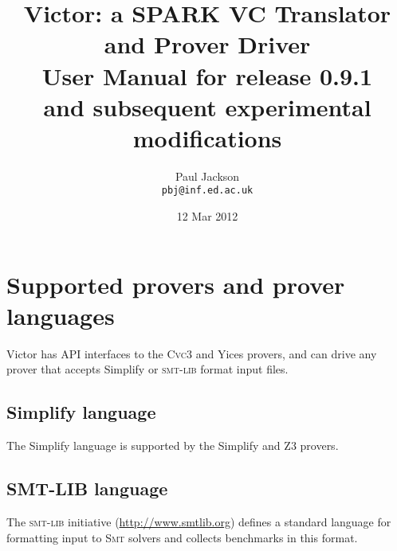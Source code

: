 \documentclass[12pt,fleqn]{article}
\title{Victor: a SPARK VC Translator and Prover Driver \\[4ex]
  \Large
  User Manual for release 0.9.1 \\
  and subsequent experimental modifications \\[1ex]
}
\author{Paul Jackson \\
        \texttt{pbj@inf.ed.ac.uk}}
\date{12 Mar 2012}
\newcommand{\cvcthree}{\textsc{Cvc}3}
\newcommand{\zthree}{\textsc{Z}3}
\newcommand{\yices}{Yices}
\newcommand{\smt}{\textsc{Smt}}
\newcommand{\smtlib}{\textsc{smt-lib}}
\begin{document}
\maketitle


\tableofcontents


\setlength{\parskip}{0.8\baselineskip}


\section{Supported provers and prover languages}

Victor has API interfaces to the \cvcthree{} and \yices{} provers, and can
drive any prover that accepts Simplify or \smtlib{} format input files.

\subsection{Simplify language}

The Simplify language is supported by the Simplify and \zthree{} provers.

\subsection{SMT-LIB language}

The \smtlib{} initiative (\url{http://www.smtlib.org}) defines a
standard language for formatting input to \smt{} solvers and collects
benchmarks in this format.  
\end{document}
